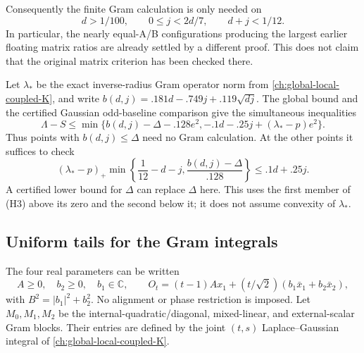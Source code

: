 Consequently the finite Gram calculation is only needed on
\[
 \boxed{d>1/100,\qquad 0\le j<2d/7,\qquad d+j<1/12.}\tag{H2}
\]
In particular, the nearly equal-A/B configurations producing the largest
earlier floating matrix ratios are already settled by a different proof.
This does not claim that the original matrix criterion has been checked
there.

Let $\lambda_*$ be the exact inverse-radius Gram operator norm from
\autoref{ch:global-local-coupled-K}, and write
$b(d,j)=.181d-.749j+.119\sqrt{dj}$. The global bound and the certified
Gaussian odd-baseline comparison give the simultaneous inequalities
\[
 \Lambda-S\le\min\{b(d,j)-\Delta-.128e^2,
               -.1d-.25j+(\lambda_*-p)e^2\}.\tag{H3}
\]
Thus points with $b(d,j)\le\Delta$ need no Gram calculation. At the other
points it suffices to check
\[
 (\lambda_*-p)_+\min\left\{\frac1{12}-d-j,
             \frac{b(d,j)-\Delta}{.128}\right\}\le .1d+.25j.\tag{H4}
\]
A certified lower bound for $\Delta$ can replace $\Delta$ here. This
uses the first member of (H3) above its zero and the second below it;
it does not assume convexity of $\lambda_*$.

\subsection{Uniform tails for the Gram integrals}
\label{sec:uniform-gram-tail}
The four real parameters can be written
\[
 A\ge0,\quad b_2\ge0,\quad b_1\in\mathbb C,
 \qquad O_t=(t-1)A x_1+(t/\sqrt2)(b_1\bar x_1+b_2\bar x_2),
\]
with $B^2=|b_1|^2+b_2^2$. No alignment or phase restriction is imposed.
Let $M_0,M_1,M_2$ be the internal-quadratic/diagonal, mixed-linear, and
external-scalar Gram blocks. Their entries are defined by the joint
$(t,s)$ Laplace--Gaussian integral of \autoref{ch:global-local-coupled-K}.

